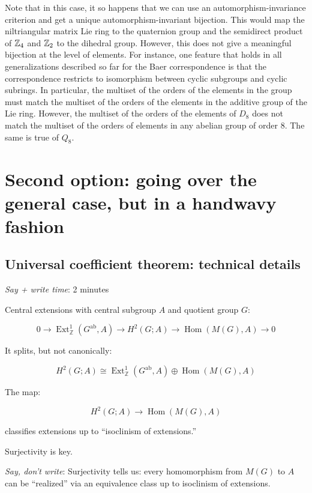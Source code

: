 \documentclass[10pt]{amsart}
\begin{document}
Note that in this case, it so happens that we can use an
automorphism-invariance criterion and get a unique
automorphism-invariant bijection. This would map the niltriangular
matrix Lie ring to the quaternion group and the semidirect product of
$\mathbb{Z}_4$ and $\mathbb{Z}_2$ to the dihedral group. However, this does not give a
meaningful bijection at the level of elements. For instance, one
feature that holds in all generalizations described so far for the
Baer correspondence is that the correspondence restricts to
isomorphism between cyclic subgroups and cyclic subrings. In
particular, the multiset of the orders of the elements in the group
must match the multiset of the orders of the elements in the additive
group of the Lie ring. However, the multiset of the orders of the
elements of $D_8$ does not match the multiset of the orders of
elements in any abelian group of order $8$. The same is true of $Q_8$.


\section{Second option: going over the general case, but in a handwavy fashion}

\subsection{Universal coefficient theorem: technical details}

{\em Say + write time}: 2 minutes

Central extensions with central subgroup $A$ and quotient group $G$:

\begin{equation*}
  0 \to \operatorname{Ext}^1_{\mathbb{Z}}(G^{\operatorname{ab}},A) \to H^2(G;A) \to \operatorname{Hom}(M(G),A) \to 0
\end{equation*}

It splits, but not canonically:

$$H^2(G;A) \cong \operatorname{Ext}^1_{\mathbb{Z}}(G^{\operatorname{ab}},A) \oplus \operatorname{Hom}(M(G),A)$$

The map:

$$H^2(G;A) \to \operatorname{Hom}(M(G),A)$$

classifies extensions up to ``isoclinism of extensions.''

Surjectivity is key.

{\em Say, don't write}: Surjectivity tells us: every homomorphism from
$M(G)$ to $A$ can be ``realized'' via an equivalence class up to
isoclinism of extensions.
\end{document}
